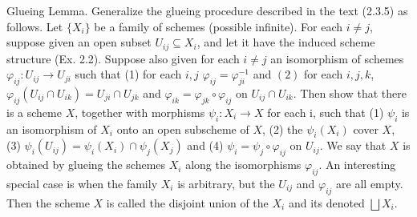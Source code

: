 \begin{ex}
	Glueing Lemma. Generalize the glueing procedure described in the text (2.3.5) as follows. Let $\{X_i\}$ be a family of schemes (possible infinite). For each $i \neq j$, suppose given an open subset $U_{ij} \subseteq X_i$, and let it have the induced scheme structure (Ex. 2.2). Suppose also given for each $i \neq j$ an isomorphism of schemes $\varphi_{ij}: U_{ij} \to U_{ji}$ such that (1) for each $i,j$ $\varphi_{ij} = \varphi_{ji}^{-1}$ and $(2)$ for each $i,j,k$, $\varphi_{ij}(U_{ij} \cap U_{ik}) = U_{ji} \cap U_{jk}$ and $\varphi_{ik} = \varphi_{jk} \circ \varphi_{ij}$ on $U_{ij} \cap U_{ik}$. Then show that there is a scheme $X$, together with morphisms $\psi_i: X_i \to X$ for each i, such that (1) $\psi_i$ is an isomorphism of $X_i$ onto an open subscheme of $X$, (2) the $\psi_i(X_i)$ cover $X$, (3) $\psi_i(U_{ij}) = \psi_i(X_i) \cap \psi_j(X_j)$ and (4) $\psi_i = \psi_j \circ \varphi_{ij}$ on $U_{ij}$. We say that $X$ is obtained by glueing the schemes $X_i$ along the isomorphisms $\varphi_{ij}$. An interesting special case is when the family $X_i$ is arbitrary, but the $U_{ij}$ and $\varphi_{ij}$ are all empty. Then the scheme $X$ is called the disjoint union of the $X_i$ and its denoted $\bigsqcup X_i$.
\end{ex}

